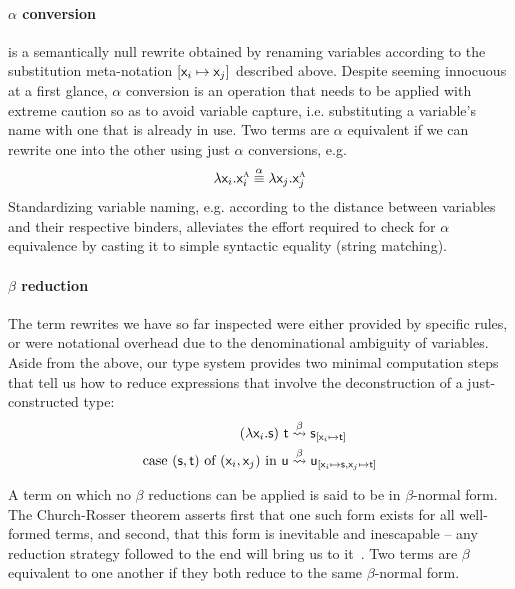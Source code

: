 \paragraph{$\alpha$ conversion} is a semantically null rewrite obtained by renaming variables according to the substitution meta-notation ${[\mathsf{\mathsf{x}_{\mathnormal{i}} } \mapsto \mathsf{\mathsf{x}_{\mathnormal{j}}}]}$ described above. 
Despite seeming innocuous at a first glance, $\alpha$ conversion is an operation that needs to be applied with extreme caution so as to avoid variable capture, i.e. substituting a variable's name with one that is already in use.  
Two terms are $\alpha$ equivalent if we can rewrite one into the other using just $\alpha$ conversions, e.g.
\begin{equation}
	\mathnormal{\lambda} \mathsf{x}_{\mathnormal{i}} .\mathsf{x}_{\mathnormal{i}} ^{\normalfont\textsc{a}} \overset{\alpha}{\equiv} \mathnormal{\lambda} \mathsf{x}_{\mathnormal{j}}.\mathsf{x}_{\mathnormal{j}}^{\normalfont\textsc{a}}
\end{equation}
Standardizing variable naming, e.g. according to the distance between variables and their respective binders, alleviates the effort required to check for $\alpha$ equivalence by casting it to simple syntactic equality (string matching).

\paragraph{$\beta$ reduction}
The term rewrites we have so far inspected were either provided by specific rules, or were notational overhead due to the denominational ambiguity of variables.
Aside from the above, our type system provides two minimal computation steps that tell us how to reduce expressions that involve the deconstruction of a just-constructed type:
\begin{align}
(\mathsf{\mathnormal{\lambda} \mathsf{x}_{\mathnormal{i}} .s})~\mathsf{t} & \overset{\beta}{\leadsto} \mathsf{s}_{[\mathsf{\mathsf{x}_{\mathnormal{i}} } \mapsto \mathsf{t}]}\\
\textrm{case \ensuremath{\mathsf{(s, t)}} of \ensuremath{\mathsf{(\mathsf{x}_{\mathnormal{i}}, \mathsf{x}_{\mathnormal{j}})}} in \ensuremath{\mathsf{u}}} & \overset{\beta}{\leadsto} \mathsf{u_{[\mathsf{\mathsf{x}_{\mathnormal{i}}} \mapsto \mathsf{s}, \mathsf{\mathsf{x}_{\mathnormal{j}}} \mapsto \mathsf{t}]}}
\end{align}

A term on which no $\beta$ reductions can be applied is said to be in $\beta$-normal form.
The Church-Rosser theorem asserts first that one such form exists for all well-formed terms, and second, that this form is inevitable and inescapable -- any reduction strategy followed to the end will bring us to it~\cite{barendregt1984lambda}.
Two terms are $\beta$ equivalent to one another if they both reduce to the same $\beta$-normal form.

